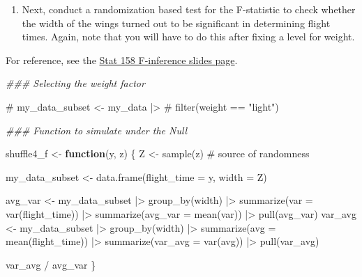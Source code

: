 \documentclass[
  letterpaper,
  DIV=11,
  numbers=noendperiod]{scrartcl}
\newenvironment{Shaded}{\begin{snugshade}}{\end{snugshade}}
\newcommand{\AttributeTok}[1]{\textcolor[rgb]{0.40,0.45,0.13}{#1}}
\newcommand{\CommentTok}[1]{\textcolor[rgb]{0.37,0.37,0.37}{#1}}
\newcommand{\ControlFlowTok}[1]{\textcolor[rgb]{0.00,0.23,0.31}{\textbf{#1}}}
\newcommand{\DocumentationTok}[1]{\textcolor[rgb]{0.37,0.37,0.37}{\textit{#1}}}
\newcommand{\FunctionTok}[1]{\textcolor[rgb]{0.28,0.35,0.67}{#1}}
\newcommand{\NormalTok}[1]{\textcolor[rgb]{0.00,0.23,0.31}{#1}}
\newcommand{\OtherTok}[1]{\textcolor[rgb]{0.00,0.23,0.31}{#1}}
\newcommand{\SpecialCharTok}[1]{\textcolor[rgb]{0.37,0.37,0.37}{#1}}
\providecommand{\tightlist}{%
  \setlength{\itemsep}{0pt}\setlength{\parskip}{0pt}}
\begin{document}
\begin{enumerate}
\def\labelenumi{\arabic{enumi}.}
\setcounter{enumi}{9}
\tightlist
\item
  Next, conduct a randomization based test for the F-statistic to check
  whether the width of the wings turned out to be significant in
  determining flight times. Again, note that you will have to do this
  after fixing a level for weight.
\end{enumerate}

For reference, see the
\href{https://stat158.berkeley.edu/spring-2026/13-f-inference/slides.html\#/title-slide}{Stat
158 F-inference slides page}.

\begin{Shaded}
\begin{Highlighting}[]
\DocumentationTok{\#\#\# Selecting the weight factor}

\CommentTok{\# my\_data\_subset \textless{}{-} my\_data |\textgreater{}}
\CommentTok{\#   filter(weight == "light")}
\end{Highlighting}
\end{Shaded}

\begin{Shaded}
\begin{Highlighting}[]
\DocumentationTok{\#\#\# Function to simulate under the Null}

\NormalTok{shuffle4\_f }\OtherTok{\textless{}{-}} \ControlFlowTok{function}\NormalTok{(y, z) \{}
\NormalTok{  Z }\OtherTok{\textless{}{-}} \FunctionTok{sample}\NormalTok{(z) }\CommentTok{\# source of randomness}

\NormalTok{  my\_data\_subset }\OtherTok{\textless{}{-}} \FunctionTok{data.frame}\NormalTok{(}\AttributeTok{flight\_time =}\NormalTok{ y,}
                           \AttributeTok{width =}\NormalTok{ Z)}
  
\NormalTok{  avg\_var }\OtherTok{\textless{}{-}}\NormalTok{ my\_data\_subset }\SpecialCharTok{|\textgreater{}}
    \FunctionTok{group\_by}\NormalTok{(width) }\SpecialCharTok{|\textgreater{}}
    \FunctionTok{summarize}\NormalTok{(}\AttributeTok{var =} \FunctionTok{var}\NormalTok{(flight\_time)) }\SpecialCharTok{|\textgreater{}}
    \FunctionTok{summarize}\NormalTok{(}\AttributeTok{avg\_var =} \FunctionTok{mean}\NormalTok{(var)) }\SpecialCharTok{|\textgreater{}}
    \FunctionTok{pull}\NormalTok{(avg\_var)}
\NormalTok{  var\_avg }\OtherTok{\textless{}{-}}\NormalTok{ my\_data\_subset }\SpecialCharTok{|\textgreater{}}
    \FunctionTok{group\_by}\NormalTok{(width) }\SpecialCharTok{|\textgreater{}}
    \FunctionTok{summarize}\NormalTok{(}\AttributeTok{avg =} \FunctionTok{mean}\NormalTok{(flight\_time)) }\SpecialCharTok{|\textgreater{}}
    \FunctionTok{summarize}\NormalTok{(}\AttributeTok{var\_avg =} \FunctionTok{var}\NormalTok{(avg)) }\SpecialCharTok{|\textgreater{}}
    \FunctionTok{pull}\NormalTok{(var\_avg)}

\NormalTok{  var\_avg }\SpecialCharTok{/}\NormalTok{ avg\_var}
\NormalTok{\}}
\end{Highlighting}
\end{Shaded}
\end{document}
